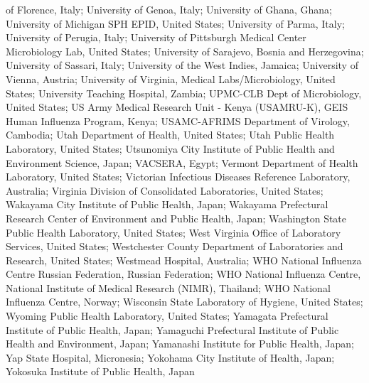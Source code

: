 \begin{appendixbox}
of Florence, Italy; University of Genoa, Italy; University of Ghana, Ghana; University of Michigan SPH EPID, United States; University of Parma, Italy; University of Perugia, Italy; University of Pittsburgh Medical Center Microbiology Lab, United States; University of Sarajevo, Bosnia and Herzegovina; University of Sassari, Italy; University of the West Indies, Jamaica; University of Vienna, Austria; University of Virginia, Medical Labs/Microbiology, United States; University Teaching Hospital, Zambia; UPMC-CLB Dept of Microbiology, United States; US Army Medical Research Unit - Kenya (USAMRU-K), GEIS Human Influenza Program, Kenya; USAMC-AFRIMS Department of Virology, Cambodia; Utah Department of Health, United States; Utah Public Health Laboratory, United States; Utsunomiya City Institute of Public Health and Environment Science, Japan; VACSERA, Egypt; Vermont Department of Health Laboratory, United States; Victorian Infectious Diseases Reference Laboratory, Australia; Virginia Division of Consolidated Laboratories, United States; Wakayama City Institute of Public Health, Japan; Wakayama Prefectural Research Center of Environment and Public Health, Japan; Washington State Public Health Laboratory, United States; West Virginia Office of Laboratory Services, United States; Westchester County Department of Laboratories and Research, United States; Westmead Hospital, Australia; WHO National Influenza Centre Russian Federation, Russian Federation; WHO National Influenza Centre, National Institute of Medical Research (NIMR), Thailand; WHO National Influenza Centre, Norway; Wisconsin State Laboratory of Hygiene, United States; Wyoming Public Health Laboratory, United States; Yamagata Prefectural Institute of Public Health, Japan; Yamaguchi Prefectural Institute of Public Health and Environment, Japan; Yamanashi Institute for Public Health, Japan; Yap State Hospital, Micronesia; Yokohama City Institute of Health, Japan; Yokosuka Institute of Public Health, Japan

\end{appendixbox}
